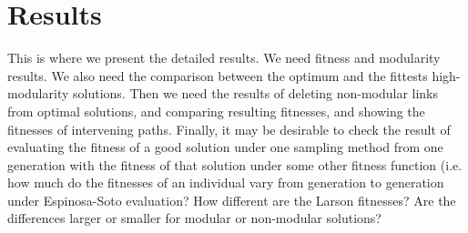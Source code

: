 \section{Results}
This is where we present the detailed results. We need fitness and modularity 
results. We also need the comparison between the optimum and the fittests
high-modularity solutions. Then we need the results of deleting non-modular 
links from optimal solutions, and comparing resulting fitnesses, and showing the
fitnesses of intervening paths. Finally, it may be desirable to check the result
of evaluating the fitness of a good solution under one sampling method from one
generation with the fitness of that solution under some other fitness function
(i.e. how much do the fitnesses of an individual vary from generation to 
generation under Espinosa-Soto evaluation? How different are the Larson 
fitnesses? Are the differences larger or smaller for modular or non-modular
solutions?

